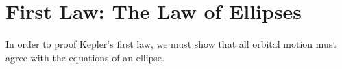 \documentclass[11pt]{article}
\begin{document}
%
%  
%
%  
%  
%  
%
%  
%
%  
%
%  
%
% 
%
%
%
% 
%
%

\section{First Law: The Law of Ellipses}
In order to proof Kepler's first law, we must show that all orbital motion must
agree with the equations of an ellipse.
\end{document}
